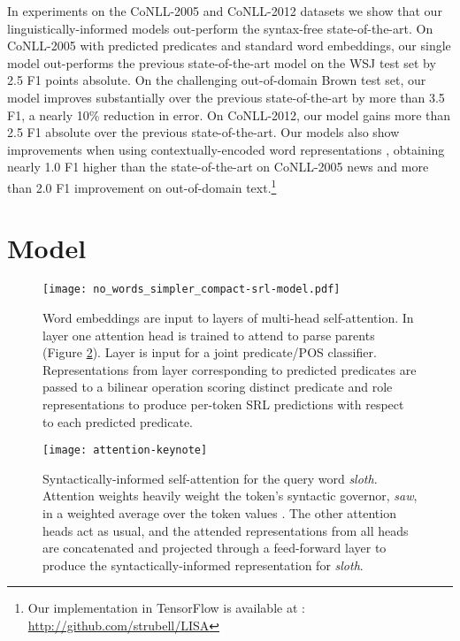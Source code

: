 \documentclass[11pt,a4paper]{article}
\begin{document}
In experiments on the CoNLL-2005 and CoNLL-2012 datasets we show that our linguistically-informed models out-perform the syntax-free state-of-the-art. On CoNLL-2005 with predicted predicates and standard word embeddings, our single model out-performs the previous state-of-the-art model on the WSJ test set by 2.5 F1 points absolute. On the challenging out-of-domain Brown test set, our model improves substantially over the previous state-of-the-art by more than 3.5 F1, a nearly 10\% reduction in error. On CoNLL-2012, our model gains more than 2.5 F1 absolute over the previous state-of-the-art. Our models also show improvements when using contextually-encoded word representations \citep{peters2018deep}, obtaining nearly 1.0 F1 higher than the state-of-the-art on CoNLL-2005 news and more than 2.0 F1 improvement on out-of-domain text.\footnote{Our implementation in TensorFlow \citep{abadi2015tensorflow} is available at : \protect\url{http://github.com/strubell/LISA}}

\section{Model}

\begin{figure}[t]
\begin{center}
\texttt{[image: no\_words\_simpler\_compact-srl-model.pdf]}
\caption{Word embeddings are input to  layers of multi-head self-attention. In layer  one attention head is trained to attend to parse parents (Figure \ref{attention-fig}). Layer  is input for a joint predicate/POS classifier. Representations from layer  corresponding to predicted predicates are passed to  a bilinear operation scoring distinct predicate and role representations to produce per-token SRL predictions with respect to each predicted predicate.\label{architecture-fig}}
\end{center}
\end{figure}

\begin{figure}[t]
\begin{center}
\texttt{[image: attention-keynote]}
\caption{Syntactically-informed self-attention for the query word \emph{sloth}. Attention weights  heavily weight the token's syntactic governor, \emph{saw}, in a weighted average over the token values . The other attention heads act as usual, and the attended representations from all heads are concatenated and projected through a feed-forward layer to produce the syntactically-informed representation for \emph{sloth}. \label{attention-fig}}
\end{center}
\end{figure}
\end{document}
